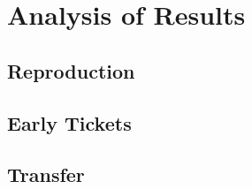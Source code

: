 \section{Analysis of Results}
\subsection*{Reproduction}
\subsection*{Early Tickets}
\subsection*{Transfer}

